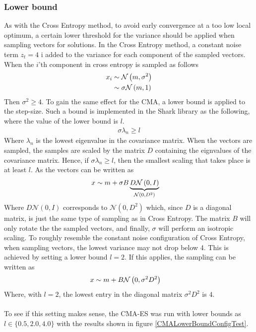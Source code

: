 \subsubsection{Lower bound}

As with the Cross Entropy method, to avoid early convergence
at a too low local optimum, a 
certain lower threshold for the variance should be applied when 
sampling vectors for solutions. In the Cross Entropy method, a constant 
noise term $z_t = 4$ i added to the variance for each component
of the sampled vectors. When the $i$'th component in cross entropy is
sampled as follows
\begin{align*}
x_i &\sim \mathcal{N}\left(m, \sigma^{2}\right)\\
              &\sim \sigma \mathcal{N}\left(m, 1\right)
\end{align*}
Then $\sigma^{2} \geq 4$. To gain the same effect for the CMA, a lower bound 
is applied to the step-size. Such a bound is implemented in the Shark library
as the following, where the value of the lower bound is $l$.
\begin{align*}
\sigma  \lambda_n \geq l
\end{align*}
Where $\lambda_n$ is the lowest eigenvalue in the covariance matrix. 
When the vectors are sampled, the samples are scaled by the matrix $D$
containing the eignvalues of the covariance matrix. 
Hence, if $\sigma \lambda_n \geq l$, then the smallest scaling
that takes place is at least $l$. As the vectors can be written 
as
\begin{align*}
x &\sim m + \sigma B 
\underbrace{D \mathcal{N}\left(0, I \right)}_{\mathcal{N}\left(0, D^2 \right)}
\end{align*}
Where $D \mathcal{N}\left(0, I \right)$ corresponds to 
$\mathcal{N}\left(0, D^2 \right)$ which, since $D$ is a diagonal
matrix, is just the same type of sampling as in Cross Entropy. 
The matrix $B$ will only rotate the the sampled vectors, and finally,
$\sigma$ will perform an isotropic scaling. 
To roughly resemble the constant noise configuration of Cross Entropy,
when sampling vectors, the lowest variance may not drop below 4. 
This is achieved by setting a lower bound $l=2$. If this applies,
the sampling can be written as
\begin{align*}
x &\sim m +  B \mathcal{N}\left(0, \sigma^2 D^2 \right)
\end{align*}
Where, with $l=2$, the lowest entry in the diagonal matrix $\sigma^2 D^2$
is $4$.\\
\\
To see if this setting makes sense, the CMA-ES was run with lower bounds as 
$l \in \{0.5, 2.0, 4.0\}$ with the results shown in figure \ref{CMALowerBoundConfigTest}.

